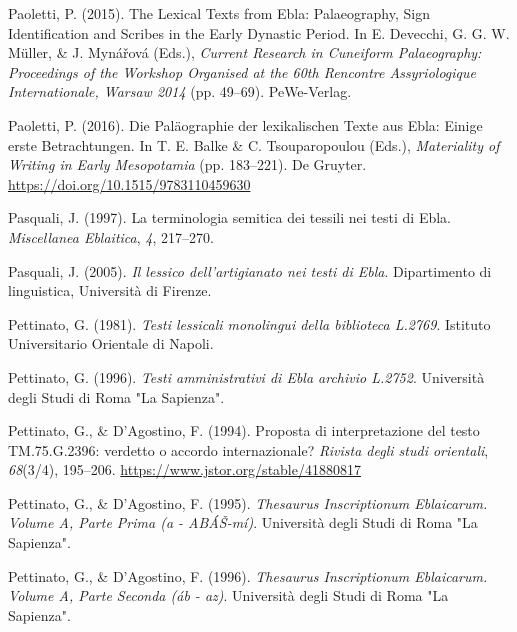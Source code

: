 \documentclass[
]{book}
\newlength{\cslhangindent}
\newlength{\cslentryspacingunit} %
\newenvironment{CSLReferences}[2] %
 {%
  \setlength{\parindent}{0pt}
  \ifodd #1
  \let\oldpar\par
  \def\par{\hangindent=\cslhangindent\oldpar}
  \fi
  \setlength{\parskip}{#2\cslentryspacingunit}
 }%
 {}
\begin{document}
\begin{CSLReferences}{1}{0}
\leavevmode{}%
Paoletti, P. (2015). The {Lexical Texts} from {Ebla}: {Palaeography}, {Sign Identification} and {Scribes} in the {Early Dynastic Period}. In E. Devecchi, G. G. W. Müller, \& J. Mynářová (Eds.), \emph{Current {Research} in {Cuneiform Palaeography}: {Proceedings} of the {Workshop Organised} at the 60th {Rencontre Assyriologique Internationale}, {Warsaw} 2014} (pp. 49--69). PeWe-Verlag.

\leavevmode{}%
Paoletti, P. (2016). {Die Pal{ä}ographie der lexikalischen Texte aus Ebla: Einige erste Betrachtungen}. In T. E. Balke \& C. Tsouparopoulou (Eds.), \emph{{Materiality of Writing in Early Mesopotamia}} (pp. 183--221). De Gruyter. \url{https://doi.org/10.1515/9783110459630}

\leavevmode{}%
Pasquali, J. (1997). {La terminologia semitica dei tessili nei testi di Ebla}. \emph{Miscellanea Eblaitica}, \emph{4}, 217--270.

\leavevmode{}%
Pasquali, J. (2005). \emph{{Il lessico dell'artigianato nei testi di Ebla}}. Dipartimento di linguistica, Universit{à} di Firenze.

\leavevmode{}%
Pettinato, G. (1981). \emph{{Testi lessicali monolingui della biblioteca L.2769}}. Istituto Universitario Orientale di Napoli.

\leavevmode{}%
Pettinato, G. (1996). \emph{{Testi amministrativi di Ebla archivio L.2752}}. Universit{à} degli Studi di Roma "La Sapienza".

\leavevmode{}%
Pettinato, G., \& D'Agostino, F. (1994). {Proposta di interpretazione del testo TM.75.G.2396: verdetto o accordo internazionale?} \emph{Rivista degli studi orientali}, \emph{68}(3/4), 195--206. \url{https://www.jstor.org/stable/41880817}

\leavevmode{}%
Pettinato, G., \& D'Agostino, F. (1995). \emph{{Thesaurus Inscriptionum Eblaicarum. Volume A, Parte Prima (a - AB{\texttimes}{Á}{Š}-m{í})}}. Universit{à} degli Studi di Roma "La Sapienza".

\leavevmode{}%
Pettinato, G., \& D'Agostino, F. (1996). \emph{{Thesaurus Inscriptionum Eblaicarum. Volume A, Parte Seconda ({á}b - az)}}. Universit{à} degli Studi di Roma "La Sapienza".


\end{CSLReferences}
\end{document}
